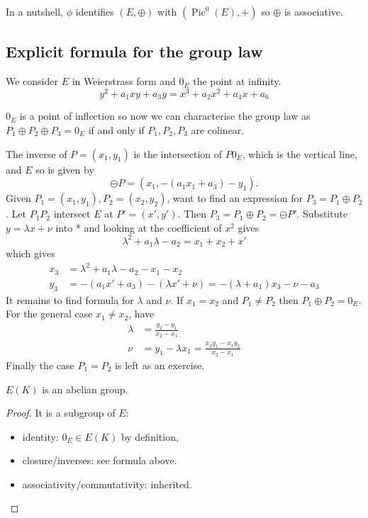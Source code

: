 \documentclass[a4paper]{article}
\theoremstyle{definition}
\theoremstyle{theorem}
\DeclareMathOperator{\Pic}{Pic} %
\begin{document}
In a nutshell, \(\phi\) identifies \((E, \oplus)\) with \((\Pic^0(E), +)\) so \(\oplus\) is associative.

\subsection{Explicit formula for the group law}

We consider \(E\) in Weierstrass form and \(0_E\) the point at infinity.
\[
  y^2 + a_1xy + a_3 y = x^3 + a_2x^2 + a_4x + a_6
\]

\begin{remark}
  \(0_E\) is a point of inflection so now we can characterise the group law as \(P_1 \oplus P_2 \oplus P_3 = 0_E\) if and only if \(P_1, P_2, P_3\) are colinear.
\end{remark}

The inverse of \(P = (x_1, y_1)\) is the intersection of \(P0_E\), which is the vertical line, and \(E\) so is given by
\[
  \ominus P = (x_1, -(a_1x_1 + a_3) - y_1).
\]
Given \(P_1 = (x_1, y_1), P_2 = (x_2, y_2)\), want to find an expression for \(P_3 = P_1 \oplus P_2\). Let \(P_1P_2\) intersect \(E\) at \(P' = (x', y')\). Then \(P_3 = P_1 \oplus P_2 = \ominus P'\). Substitute \(y = \lambda x + \nu\) into * and looking at the coefficient of \(x^2\) gives
\[
  \lambda^2 + a_1 \lambda - a_2 = x_1 + x_2 + x'
\]
which gives
\begin{align*}
  x_3 &= \lambda^2 + a_1 \lambda - a_2 - x_1 - x_2 \\
  y_3 &= -(a_1x' + a_3) - (\lambda x' + \nu) = -(\lambda + a_1) x_3 - \nu - a_3
\end{align*}
It remains to find formula for \(\lambda\) and \(\nu\). If \(x_1 = x_2\) and \(P_1 \neq P_2\) then \(P_1 \oplus P_2 = 0_E\). For the general case \(x_1 \neq x_2\), have
\begin{align*}
  \lambda &= \frac{y_2 - y_1}{x_2 - x_1} \\
  \nu &= y_1 - \lambda x_1 = \frac{x_2y_1 - x_1 y_2}{x_2 - x_1}
\end{align*}
Finally the case \(P_1 = P_2\) is left as an exercise.

\begin{corollary}
  \(E(K)\) is an abelian group.
\end{corollary}

\begin{proof}
  It is a subgroup of \(E\):
  \begin{itemize}
  \item identity: \(0_E \in E(K)\) by definition,
  \item closure/inverses: see formula above.
  \item associativity/commutativity: inherited.
  \end{itemize}
\end{proof}
\end{document}
